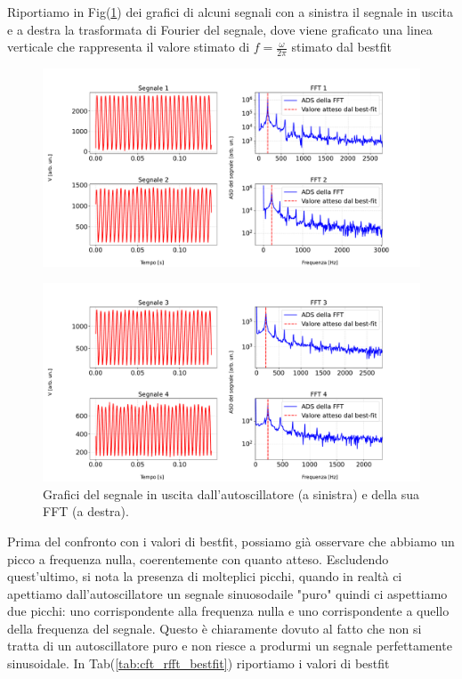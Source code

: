 \documentclass{article}
\begin{document}
Riportiamo in Fig(\ref{fig:sign_rfft_autoscill}) dei grafici di alcuni segnali con a sinistra il segnale in uscita e a destra la trasformata di Fourier del segnale, dove viene graficato una linea verticale che rappresenta il valore stimato di $f = \frac{\omega}{2 \pi}$ stimato dal bestfit
\begin{figure}[H]
    \centering
    \includegraphics[scale=0.425]{FFT11/first_graph.pdf}
\end{figure}
\begin{figure}[H]
    \centering
    \includegraphics[scale=0.425]{FFT11/second_graph.pdf}
    \caption{Grafici del segnale in uscita dall'autoscillatore (a sinistra) e della sua FFT (a destra).}
    \label{fig:sign_rfft_autoscill}
\end{figure}

Prima del confronto con i valori di bestfit, possiamo già osservare che abbiamo un picco a frequenza nulla, coerentemente con quanto atteso. Escludendo quest'ultimo, si nota la presenza di molteplici picchi, quando in realtà ci apettiamo dall'autoscillatore un segnale sinuosodaile "puro" quindi ci aspettiamo due picchi: uno corrispondente alla frequenza nulla e uno corrispondente a quello della frequenza del segnale. Questo è chiaramente dovuto al fatto che non si tratta di un autoscillatore puro e non riesce a produrmi un segnale perfettamente sinusoidale.
In Tab(\ref{tab:cft_rfft_bestfit}) riportiamo i valori di bestfit
\end{document}
